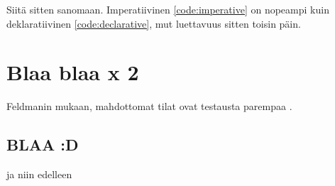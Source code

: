 Siitä sitten sanomaan. Imperatiivinen \ref{code:imperative} on nopeampi kuin deklaratiivinen \ref{code:declarative}, mut luettavuus sitten toisin päin.

\section{Blaa blaa x 2}

Feldmanin mukaan, mahdottomat tilat ovat testausta parempaa \cite{impossiblebetter}.

\subsection{BLAA :D}
ja niin edelleen